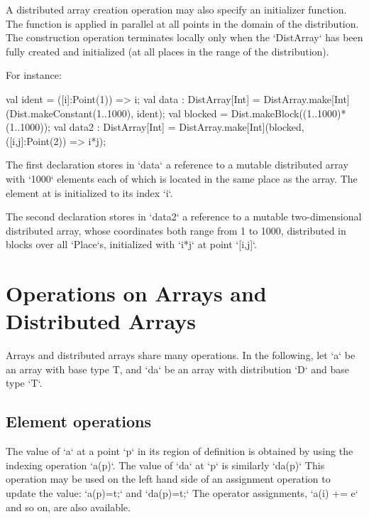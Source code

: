 \begin{ex}A distributed array creation operation may also specify an initializer
function.
The function is applied in parallel
at all points in the domain of the distribution. The
construction operation terminates locally only when the \xcd`DistArray` has been
fully created and initialized (at all places in the range of the
distribution).

For instance:
\begin{xten}
val ident = ([i]:Point(1)) => i;
val data : DistArray[Int]
    = DistArray.make[Int](Dist.makeConstant(1..1000), ident);
val blocked = Dist.makeBlock((1..1000)*(1..1000));
val data2 : DistArray[Int]
    = DistArray.make[Int](blocked, ([i,j]:Point(2)) => i*j);
\end{xten}



{}\noindent 
The first declaration stores in \xcd`data` a reference to a mutable
distributed array with \xcd`1000` elements each of which is located in the
same place as the array. The element at \Xcd{[i]} is initialized to its index
\xcd`i`. 

The second declaration stores in \xcd`data2` a reference to a mutable
two-dimensional distributed array, whose coordinates both range from 1 to
1000, distributed in blocks over all \xcd`Place`s, 
initialized with \xcd`i*j`
at point \xcd`[i,j]`.
\end{ex}


\section{Operations on Arrays and Distributed Arrays}

Arrays and distributed arrays share many operations.
In the following, let \xcd`a` be an array with base type T, and \xcd`da` be an
array with distribution \xcd`D` and base type \xcd`T`.




\subsection{Element operations}
The value of \xcd`a` at a point \xcd`p` in its region of definition is
obtained by using the indexing operation \xcd`a(p)`. 
The value of \xcd`da` at \xcd`p` is similarly
\xcd`da(p)`
This operation
may be used on the left hand side of an assignment operation to update
the value: 
\xcd`a(p)=t;`
and 
\xcd`da(p)=t;`
The operator assignments, \xcd`a(i) += e` and so on,  are also
available. 

